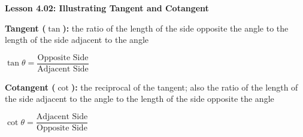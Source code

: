 \begin{center}
\textbf{Lesson 4.02: Illustrating Tangent and Cotangent}
\end{center}

\vspace*{-1.5ex}

\noindent \textbf{Tangent ($\tan$):} the ratio of the length of the side opposite the angle to the length of the side adjacent to the angle

{\centering $
    \tan \theta = \dfrac{\text{Opposite Side}}{\text{Adjacent Side}}
$\par}

\noindent  \textbf{Cotangent ($\cot$):} the reciprocal of the tangent; also the ratio of the length of the side adjacent to the angle to the length of the side opposite the angle

{\centering $
    \cot \theta = \dfrac{\text{Adjacent Side}}{\text{Opposite Side}}
$\par}

